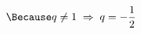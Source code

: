 \documentclass[preview]{standalone}
\begin{document}
\begin{align*}
\special{dvisvgm:raw <g id='unique000'>}\Because q\neq1 \;\Rightarrow\; q=-\frac{1}{2}\special{dvisvgm:raw </g>}
\end{align*}
\end{document}
